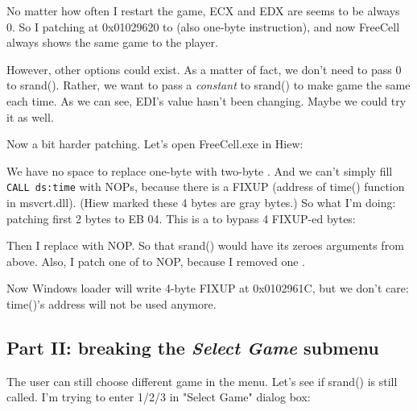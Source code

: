 No matter how often I restart the game, ECX and EDX are seems to be always 0.
So I patching  at 0x01029620 to  (also one-byte instruction),
and now FreeCell always shows the same game to the player.

However, other options could exist.
As a matter of fact, we don't need to pass 0 to srand().
Rather, we want to pass a \emph{constant} to srand() to make game the same each time.
As we can see, EDI's value hasn't been changing. Maybe we could try it as well.

Now a bit harder patching.
Let's open FreeCell.exe in Hiew:

\begin{figure}[H]
\centering
{}
\end{figure}

We have no space to replace one-byte  with two-byte .
And we can't simply fill \verb|CALL ds:time| with \ac{NOP}s, because there is a FIXUP (address of time() function in msvcrt.dll).
(Hiew marked these 4 bytes are gray bytes.)
So what I'm doing: patching first 2 bytes to EB 04. This is a  to bypass 4 FIXUP-ed bytes:

\begin{figure}[H]
\centering
{}
\end{figure}

Then I replace  with \ac{NOP}. So that srand() would have its zeroes arguments from  above.
Also, I patch one of  to \ac{NOP}, because I removed one .

\begin{figure}[H]
\centering
{}
\end{figure}

Now Windows loader will write 4-byte FIXUP at 0x0102961C, but we don't care: time()'s address will not be used anymore.

\subsection{Part II: breaking the \emph{Select Game} submenu}

The user can still choose different game in the menu.
Let's see if srand() is still called.
I'm trying to enter 1/2/3 in "Select Game" dialog box:

